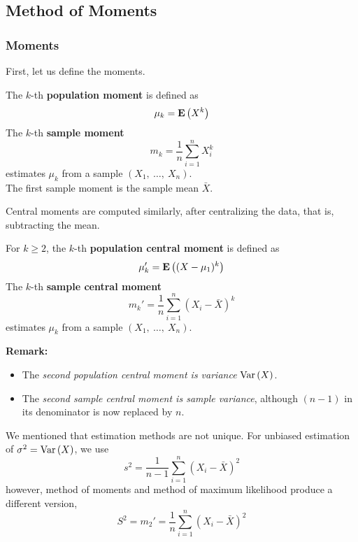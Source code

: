 \subsection{Method of Moments}
\label{subsec:method-of-moments}

\subsubsection{Moments}
\label{subsubsec:moments}

First, let us define the moments.
\begin{definition}{}
  The $k$-th \textbf{population moment} is defined as
  \begin{equation*}
    \mu_k = \mathbf{E}\left(X^{k}\right)
  \end{equation*}
  The $k$-th \textbf{sample moment}
  \begin{equation*}
    m_k = \frac{1}{n} \sum_{i=1}^{n} X_i^k
  \end{equation*}
  estimates $\mu_k$ from a sample $(X_1,\ \ldots,\ X_n)$. \\

  The first sample moment is the sample mean $\bar{X}$.  
\end{definition}

Central moments are computed similarly, after centralizing the data, that is, subtracting the mean.

\begin{definition}{}
  For $k \geq 2$, the $k$-th \textbf{population central moment} is defined as
  \begin{equation*}
    \mu_k' = \mathbf{E}\left((X - \mu_1)^{k}\right)
  \end{equation*}
  The $k$-th \textbf{sample central moment}
  \begin{equation*}
    m_k' = \frac{1}{n} \sum_{i=1}^{n} (X_i - \bar{X})^k
  \end{equation*}
  estimates $\mu_k$ from a sample $(X_1,\ \ldots,\ X_n)$.
\end{definition}

\textbf{Remark:} 
\begin{itemize}
  \item The \textit{second population central moment is variance} $\text{Var}\left( X \right)$.
  \item The \textit{second sample central moment is sample variance}, although $(n - 1)$ in its denominator is now replaced by $n$.
\end{itemize}
We mentioned that estimation methods are not unique. For unbiased estimation of $\sigma^2 = \text{Var}\left( X \right)$, we use
\begin{equation*}
  s^2 = \frac{1}{n - 1} \sum_{i=1}^{n} (X_i - \bar{X})^2
\end{equation*}
however, method of moments and method of maximum likelihood produce a different version,
\begin{equation*}
  S^2 = m_2' = \frac{1}{n} \sum_{i=1}^{n} (X_i - \bar{X})^2
\end{equation*}


